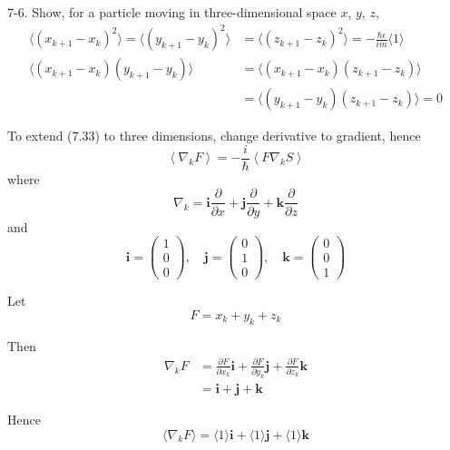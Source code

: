 \documentclass[12pt]{article}
\begin{document}
7-6.
Show, for a particle moving in three-dimensional space $x$, $y$, $z$,
\begin{align*}
\langle(x_{k+1}-x_k)^2\rangle
=\langle(y_{k+1}-y_k)^2\rangle
&=\langle(z_{k+1}-z_k)^2\rangle
=-\frac{\hbar\epsilon}{im}\langle1\rangle
\tag{7.50}
\\
\langle(x_{k+1}-x_k)(y_{k+1}-y_k)\rangle
&=\langle(x_{k+1}-x_k)(z_{k+1}-z_k)\rangle
\\
&=\langle(y_{k+1}-y_k)(z_{k+1}-z_k)\rangle=0
\tag{7.51}
\end{align*}

To extend (7.33) to three dimensions, change derivative to gradient, hence
\begin{equation*}
\left\langle\nabla_kF\right\rangle=-\frac{i}{\hbar}\left\langle F\nabla_kS\right\rangle
\tag{1}
\end{equation*}
where
\begin{equation*}
\nabla_k
=\mathbf i\frac{\partial}{\partial x}
+\mathbf j\frac{\partial}{\partial y}
+\mathbf k\frac{\partial}{\partial z}
\end{equation*}
and
\begin{equation*}
\mathbf i=\begin{pmatrix}1\\0\\0\end{pmatrix},
\quad
\mathbf j=\begin{pmatrix}0\\1\\0\end{pmatrix},
\quad
\mathbf k=\begin{pmatrix}0\\0\\1\end{pmatrix}
\end{equation*}

Let
\begin{equation*}
F=x_k+y_k+z_k
\end{equation*}

Then
\begin{align*}
\nabla_kF
&=\frac{\partial F}{\partial x_k}\mathbf i
+\frac{\partial F}{\partial y_k}\mathbf j
+\frac{\partial F}{\partial z_k}\mathbf k
\\
&=\mathbf i+\mathbf j+\mathbf k
\end{align*}

Hence
\begin{equation*}
\langle\nabla_kF\rangle
=\langle1\rangle\mathbf i
+\langle1\rangle\mathbf j
+\langle1\rangle\mathbf k
\tag{2}
\end{equation*}
\end{document}
